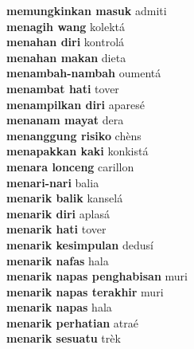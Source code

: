 \textbf{ memungkinkan masuk  } admiti \\
\textbf{ menagih wang  } kolektá \\
\textbf{ menahan diri  } kontrolá \\
\textbf{ menahan makan  } dieta \\
\textbf{ menambah-nambah  } oumentá \\
\textbf{ menambat hati  } tover \\
\textbf{ menampilkan diri  } aparesé \\
\textbf{ menanam mayat  } dera \\
\textbf{ menanggung risiko  } chèns \\
\textbf{ menapakkan kaki  } konkistá \\
\textbf{ menara lonceng  } carillon \\
\textbf{ menari-nari  } balia \\
\textbf{ menarik balik  } kanselá \\
\textbf{ menarik diri  } aplasá \\
\textbf{ menarik hati  } tover \\
\textbf{ menarik kesimpulan  } dedusí \\
\textbf{ menarik nafas  } hala \\
\textbf{ menarik napas penghabisan  } muri \\
\textbf{ menarik napas terakhir  } muri \\
\textbf{ menarik napas  } hala \\
\textbf{ menarik perhatian  } atraé \\
\textbf{ menarik sesuatu  } trèk \\
